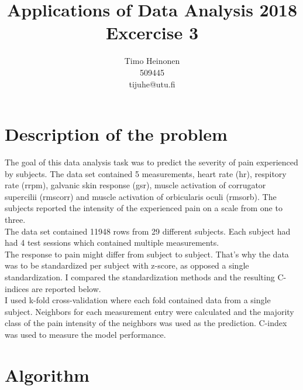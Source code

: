 \documentclass[a4paper]{article}
\title{Applications of Data Analysis 2018\\Excercise 3}
\author{Timo Heinonen\\509445\\tijuhe@utu.fi}
\begin{document}
\maketitle

\section{Description of the problem}
The goal of this data analysis task was to predict the severity of pain experienced by subjects. The data set contained 5 measurements, heart rate (hr), respitory rate (rrpm), galvanic skin response (gsr), muscle activation of corrugator supercilii (rmscorr) and muscle activation of orbicularis oculi (rmsorb). The subjects reported the intensity of the experienced pain on a scale from one to three.\\

The data set contained 11948 rows from 29 different subjects. Each subject had had 4 test sessions which contained multiple measurements.\\

The response to pain might differ from subject to subject. That's why the data was to be standardized per subject with z-score, as opposed a single standardization. I compared the standardization methods and the resulting C-indices are reported below.\\

I used k-fold cross-validation where each fold contained data from a single subject. Neighbors for each measurement entry were calculated and the majority class of the pain intensity of the neighbors was used as the prediction. C-index was used to measure the model performance.

\section{Algorithm}
\end{document}
